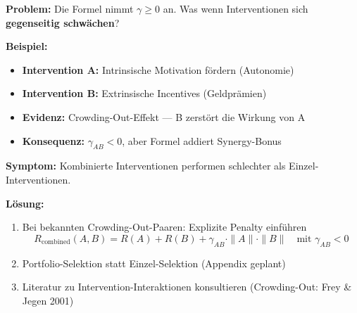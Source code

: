 \begin{tcolorbox}[colback=red!5!white, colframe=red!75!black,
    title=\textbf{Failure Mode 5: Negatives $\gamma$ (Anti-Complementarity)}]

\textbf{Problem:} Die Formel nimmt $\gamma \geq 0$ an. Was wenn Interventionen sich \textbf{gegenseitig schwächen}?

\medskip
\textbf{Beispiel:}
\begin{itemize}[nosep]
    \item \textbf{Intervention A:} Intrinsische Motivation fördern (Autonomie)
    \item \textbf{Intervention B:} Extrinsische Incentives (Geldprämien)
    \item \textbf{Evidenz:} Crowding-Out-Effekt --- B zerstört die Wirkung von A
    \item \textbf{Konsequenz:} $\gamma_{AB} < 0$, aber Formel addiert Synergy-Bonus
\end{itemize}

\medskip
\textbf{Symptom:} Kombinierte Interventionen performen schlechter als Einzel-Interventionen.

\textbf{Lösung:}
\begin{enumerate}[nosep]
    \item Bei bekannten Crowding-Out-Paaren: Explizite Penalty einführen
    \begin{equation*}
    R_{\text{combined}}(A, B) = R(A) + R(B) + \gamma_{AB} \cdot \|A\| \cdot \|B\| \quad \text{mit } \gamma_{AB} < 0
    \end{equation*}
    \item Portfolio-Selektion statt Einzel-Selektion (Appendix geplant)
    \item Literatur zu Intervention-Interaktionen konsultieren (Crowding-Out: Frey \& Jegen 2001)
\end{enumerate}

\end{tcolorbox}

